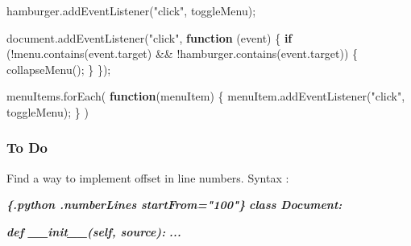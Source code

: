 \documentclass[
]{article}
\newenvironment{Shaded}{}{}
\newcommand{\AttributeTok}[1]{\textcolor[rgb]{0.49,0.56,0.16}{#1}}
\newcommand{\BuiltInTok}[1]{\textcolor[rgb]{0.00,0.50,0.00}{#1}}
\newcommand{\ControlFlowTok}[1]{\textcolor[rgb]{0.00,0.44,0.13}{\textbf{#1}}}
\newcommand{\FunctionTok}[1]{\textcolor[rgb]{0.02,0.16,0.49}{#1}}
\newcommand{\InformationTok}[1]{\textcolor[rgb]{0.38,0.63,0.69}{\textbf{\textit{#1}}}}
\newcommand{\KeywordTok}[1]{\textcolor[rgb]{0.00,0.44,0.13}{\textbf{#1}}}
\newcommand{\NormalTok}[1]{#1}
\newcommand{\OperatorTok}[1]{\textcolor[rgb]{0.40,0.40,0.40}{#1}}
\newcommand{\StringTok}[1]{\textcolor[rgb]{0.25,0.44,0.63}{#1}}
\begin{document}
\begin{Shaded}
\begin{Highlighting}[numbers=left,,]
\NormalTok{hamburger}\OperatorTok{.}\FunctionTok{addEventListener}\NormalTok{(}\StringTok{"click"}\OperatorTok{,}\NormalTok{ toggleMenu)}\OperatorTok{;}

\BuiltInTok{document}\OperatorTok{.}\FunctionTok{addEventListener}\NormalTok{(}\StringTok{"click"}\OperatorTok{,} \KeywordTok{function}\NormalTok{ (}\BuiltInTok{event}\NormalTok{) \{}
  \ControlFlowTok{if}\NormalTok{ (}\OperatorTok{!}\NormalTok{menu}\OperatorTok{.}\FunctionTok{contains}\NormalTok{(}\BuiltInTok{event}\OperatorTok{.}\AttributeTok{target}\NormalTok{) }\OperatorTok{\&\&} \OperatorTok{!}\NormalTok{hamburger}\OperatorTok{.}\FunctionTok{contains}\NormalTok{(}\BuiltInTok{event}\OperatorTok{.}\AttributeTok{target}\NormalTok{)) \{}
    \FunctionTok{collapseMenu}\NormalTok{()}\OperatorTok{;}
\NormalTok{  \}}
\NormalTok{\})}\OperatorTok{;}

\NormalTok{menuItems}\OperatorTok{.}\FunctionTok{forEach}\NormalTok{(}
  \KeywordTok{function}\NormalTok{(menuItem) \{}
\NormalTok{    menuItem}\OperatorTok{.}\FunctionTok{addEventListener}\NormalTok{(}\StringTok{"click"}\OperatorTok{,}\NormalTok{ toggleMenu)}\OperatorTok{;}
\NormalTok{  \}}
\NormalTok{)}
\end{Highlighting}
\end{Shaded}

\subsubsection*{To Do}\label{to-do}

Find a way to implement offset in line numbers. Syntax :

\begin{Shaded}
\begin{Highlighting}[]
\InformationTok{\textasciigrave{}\textasciigrave{}\textasciigrave{}\{.python .numberLines startFrom="100"\}}
\InformationTok{class Document:}

\InformationTok{    def \_\_init\_\_(self, source):}
\InformationTok{    ...}
\end{Highlighting}
\end{Shaded}
\end{document}
